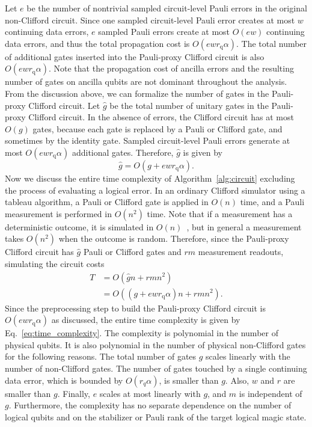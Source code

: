 \documentclass[
 reprint,
 amsmath,amssymb,
 pra,superscriptaddress, nofootinbib
]{revtex4-2}
\theoremstyle{definition}
\theoremstyle{plain}
\begin{document}
Let $e$ be the number of nontrivial sampled circuit-level Pauli errors in the original non-Clifford circuit. Since one sampled circuit-level Pauli error creates at most $w$ continuing data errors, $e$ sampled Pauli errors create at most $O(ew)$ continuing data errors, and thus the total propagation cost is $O(ewr_\mathrm{q}\alpha)$.
The total number of additional gates inserted into the Pauli-proxy Clifford circuit is also $O(ewr_\mathrm{q}\alpha)$.
Note that the propagation cost of ancilla errors and the resulting number of gates on ancilla qubits are not dominant throughout the analysis.
From the discussion above, we can formalize the number of gates in the Pauli-proxy Clifford circuit. Let $\hat{g}$ be the total number of unitary gates in the Pauli-proxy Clifford circuit. In the absence of errors, the Clifford circuit has at most $O(g)$ gates, because each gate is replaced by a Pauli or Clifford gate, and sometimes by the identity gate. Sampled circuit-level Pauli errors generate at most $O(ewr_\mathrm{q}\alpha)$ additional gates. Therefore, $\hat{g}$ is given by
\begin{equation}
  \hat{g}=O(g+ewr_\mathrm{q}\alpha).
\end{equation}
Now we discuss the entire time complexity of Algorithm~\ref{alg:circuit} excluding the process of evaluating a logical error.
In an ordinary Clifford simulator using a tableau algorithm, a Pauli or Clifford gate is applied in $O(n)$ time, and a Pauli measurement is performed in $O(n^2)$ time. Note that if a measurement has a deterministic outcome, it is simulated in $O(n)$~\cite{Gidney2021stimfaststabilizer}, but in general a measurement takes $O(n^2)$ when the outcome is random. Therefore, since the Pauli-proxy Clifford circuit has $\hat{g}$ Pauli or Clifford gates and $rm$ measurement readouts, simulating the circuit costs
\begin{align}
  T&=O(\hat{g}n+rmn^2)\\
  &=O\!\left((g+ewr_\mathrm{q}\alpha )n+rmn^2\right).
  \label{eq:time_complexity}
\end{align}
Since the preprocessing step to build the Pauli-proxy Clifford circuit is $O(ewr_\mathrm{q}\alpha)$ as discussed, the entire time complexity is given by Eq.~\eqref{eq:time_complexity}.
The complexity is polynomial in the number of physical qubits. It is also polynomial in the number of physical non-Clifford gates for the following reasons. The total number of gates $g$ scales linearly with the number of non-Clifford gates. The number of gates touched by a single continuing data error, which is bounded by $O(r_q \alpha)$, is smaller than $g$. Also, $w$ and $r$ are smaller than $g$. Finally, $e$ scales at most linearly with $g$, and $m$ is independent of $g$.
Furthermore, the complexity has no separate dependence on the number of logical qubits and on the stabilizer or Pauli rank of the target logical magic state.
\end{document}
